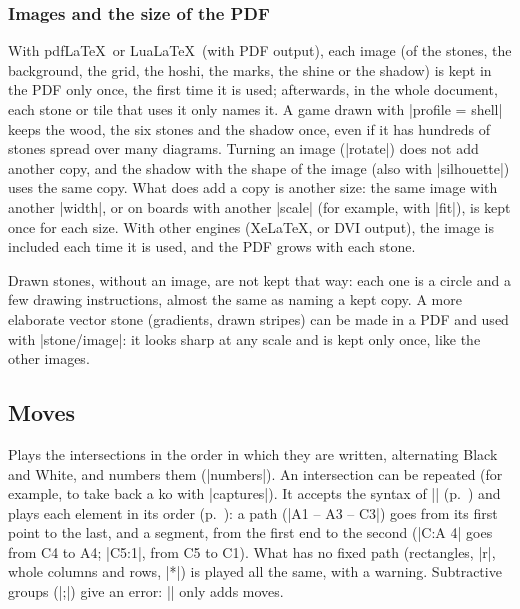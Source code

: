 \subsubsection{Images and the size of the PDF}
\label{subsubsec:imagenespdf}

With pdf\LaTeX\ or Lua\LaTeX\ (with PDF output), each image (of the stones, the background, the grid, the hoshi, the marks, the shine or the shadow) is kept in the PDF only once, the first time it is used; afterwards, in the whole document, each stone or tile that uses it only names it. A game drawn with |profile = shell| keeps the wood, the six stones and the shadow once, even if it has hundreds of stones spread over many diagrams. Turning an image (|rotate|) does not add another copy, and the shadow with the shape of the image (also with |silhouette|) uses the same copy. What does add a copy is another size: the same image with another |width|, or on boards with another |scale| (for example, with |fit|), is kept once for each size. With other engines (Xe\LaTeX, or DVI output), the image is included each time it is used, and the PDF grows with each stone.

Drawn stones, without an image, are not kept that way: each one is a circle and a few drawing instructions, almost the same as naming a kept copy. A more elaborate vector stone (gradients, drawn stripes) can be made in a PDF and used with |stone/image|: it looks sharp at any scale and is kept only once, like the other images.





\subsection{Moves}
\label{subsec:movimientos}

\begin{command}{\moves{}}

	Plays the intersections in the order in which they are written, alternating Black and White, and numbers them (|numbers|). An intersection can be repeated (for example, to take back a ko with |captures|). It accepts the syntax of |\stones| (p.~\pageref{subsec:sintaxis-de-coordenadas}) and plays each element in its order (p.~\pageref{subsec:orden-coordenadas}): a path (|A1 -- A3 -- C3|) goes from its first point to the last, and a segment, from the first end to the second (|C:A 4| goes from C4 to A4; |C5:1|, from C5 to C1). What has no fixed path (rectangles, |r|, whole columns and rows, |*|) is played all the same, with a warning. Subtractive groups (|;|) give an error: |\moves| only adds moves.

	\begin{codeexample}[]
		\begin{goban}[5]
		\end{goban}
	\end{codeexample}
\end{command}

